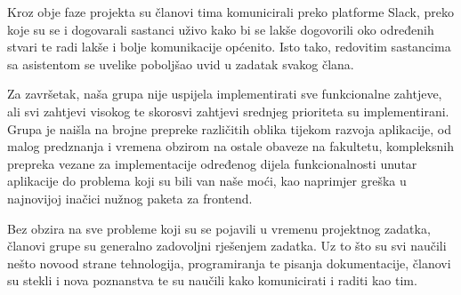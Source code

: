 		 Kroz obje faze projekta su članovi tima komunicirali preko platforme Slack, preko koje su se i dogovarali sastanci uživo kako bi se lakše dogovorili oko određenih stvari te radi lakše i bolje komunikacije općenito. Isto tako, redovitim sastancima sa asistentom se uvelike poboljšao uvid u zadatak svakog člana.
		 
		 Za završetak, naša grupa nije uspijela implementirati sve funkcionalne zahtjeve, ali svi zahtjevi visokog te skorosvi zahtjevi srednjeg prioriteta su implementirani. Grupa je naišla na brojne prepreke različitih oblika tijekom razvoja aplikacije, od malog predznanja i vremena obzirom na ostale obaveze na fakultetu, kompleksnih prepreka vezane za implementacije određenog dijela funkcionalnosti unutar aplikacije do problema koji su bili van naše moći, kao naprimjer greška u najnovijoj inačici nužnog paketa za frontend. 
		 
		 Bez obzira na sve probleme koji su se pojavili u vremenu projektnog zadatka, članovi grupe su generalno zadovoljni rješenjem zadatka. Uz to što su svi naučili nešto novood strane tehnologija, programiranja te pisanja dokumentacije, članovi su stekli i nova poznanstva te su naučili kako komunicirati i raditi kao tim.
		 
		 
		
		\eject 
		
	